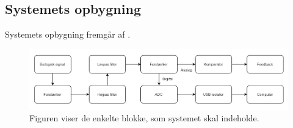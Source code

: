 



\subsection{Systemets opbygning}
Systemets opbygning fremgår af .

\begin{figure}[H]
	\centering
	\includegraphics[scale=0.7]{figures/cProblemloesning/Systemopbygning.PNG}
	\caption{Figuren viser de enkelte blokke, som systemet skal indeholde.}
	\label{kravblok}
\end{figure}

